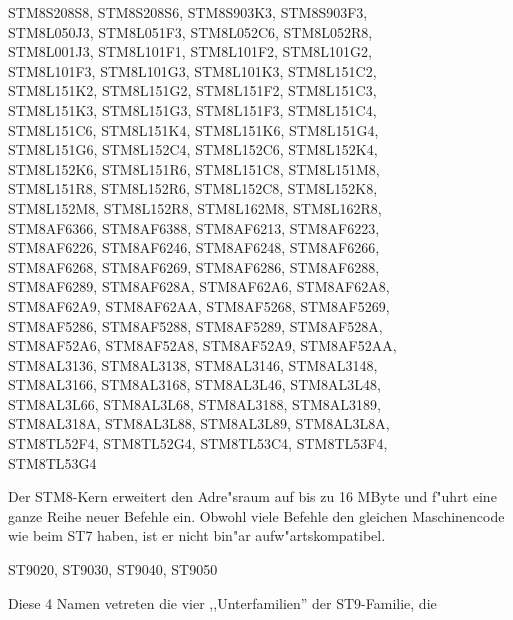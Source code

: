 \documentclass[12pt,a4paper,twoside]{report}
\begin{document}
\begin{cpulist}
\> STM8S208S8, STM8S208S6, STM8S903K3, STM8S903F3,\\
\> STM8L050J3, STM8L051F3, STM8L052C6, STM8L052R8,\\
\> STM8L001J3, STM8L101F1, STM8L101F2, STM8L101G2,\\
\> STM8L101F3, STM8L101G3, STM8L101K3, STM8L151C2,\\
\> STM8L151K2, STM8L151G2, STM8L151F2, STM8L151C3,\\
\> STM8L151K3, STM8L151G3, STM8L151F3, STM8L151C4,\\
\> STM8L151C6, STM8L151K4, STM8L151K6, STM8L151G4,\\
\> STM8L151G6, STM8L152C4, STM8L152C6, STM8L152K4,\\
\> STM8L152K6, STM8L151R6, STM8L151C8, STM8L151M8,\\
\> STM8L151R8, STM8L152R6, STM8L152C8, STM8L152K8,\\
\> STM8L152M8, STM8L152R8, STM8L162M8, STM8L162R8,\\
\> STM8AF6366, STM8AF6388, STM8AF6213, STM8AF6223,\\
\> STM8AF6226, STM8AF6246, STM8AF6248, STM8AF6266,\\
\> STM8AF6268, STM8AF6269, STM8AF6286, STM8AF6288,\\
\> STM8AF6289, STM8AF628A, STM8AF62A6, STM8AF62A8,\\
\> STM8AF62A9, STM8AF62AA, STM8AF5268, STM8AF5269,\\
\> STM8AF5286, STM8AF5288, STM8AF5289, STM8AF528A,\\
\> STM8AF52A6, STM8AF52A8, STM8AF52A9, STM8AF52AA,\\
\> STM8AL3136, STM8AL3138, STM8AL3146, STM8AL3148,\\
\> STM8AL3166, STM8AL3168, STM8AL3L46, STM8AL3L48,\\
\> STM8AL3L66, STM8AL3L68, STM8AL3188, STM8AL3189,\\
\> STM8AL318A, STM8AL3L88, STM8AL3L89, STM8AL3L8A,\\
\> STM8TL52F4, STM8TL52G4, STM8TL53C4, STM8TL53F4,\\
\> STM8TL53G4
\end{cpulist}
Der STM8-Kern erweitert den Adre"sraum auf bis zu 16 MByte und f"uhrt
eine ganze Reihe neuer Befehle ein.  Obwohl viele Befehle den
gleichen Maschinencode wie beim ST7 haben, ist er nicht bin"ar
aufw"artskompatibel.
\begin{cpulist}
   ST9020, ST9030, ST9040, ST9050
\end{cpulist}
Diese 4 Namen vetreten die vier ,,Unterfamilien'' der ST9-Familie, die
\end{document}
